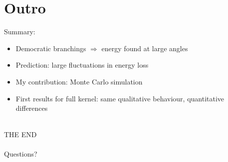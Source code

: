 \documentclass[pstricks,mathserif]{beamer}
\begin{document}
\section{Outro}
\begin{frame}


Summary:

\begin{itemize}
\item Democratic branchings $\Rightarrow$ energy found at large angles
\item Prediction: large fluctuations in energy loss
\item My contribution: Monte Carlo simulation
\item First results for full kernel: same qualitative behaviour, quantitative differences
\end{itemize}
~\\
\center THE END\\
~\\
Questions?

\end{frame}
\end{document}
